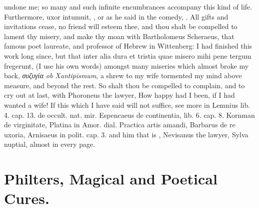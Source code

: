 undone me; so many and such infinite encumbrances accompany this kind
of life. Furthermore, uxor intumuit, \etc{}, or as he said in the comedy,
. All gifts and
invitations cease, no friend will esteem thee, and thou shalt be compelled to
lament thy misery, and make thy moan with Bartholomeus
Scheraeus, that famous poet laureate, and professor of Hebrew
in Wittenberg: I had finished this work long since, but that
inter alia dura et tristia quae misero mihi pene tergum fregerunt, (I
use his own words) amongst many miseries which almost broke my back,
\emph{\textgreek{συζυγία} \textlatin{ob Xantipismum}}, a shrew to my wife tormented my mind above
measure, and beyond the rest. So shalt thou be compelled to complain,
and to cry out at last, with Phoroneus the lawyer, How happy had
I been, if I had wanted a wife! If this which I have said will not
suffice, see more in Lemnius lib. 4. cap. 13. de occult. nat. mir.
Espencaeus de continentia, lib. 6. cap. 8. Kornman de virginitate,
Platina in Amor. dial. Practica artis amandi, Barbarus de re uxoria,
Arnisaeus in polit. cap. 3. and him that is , Nevisanus
the lawyer, Sylva nuptial, almost in every page.

\section{Philters, Magical and Poetical Cures.}

